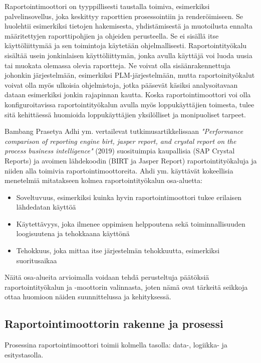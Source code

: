 Raportointimoottori on tyyppillisesti taustalla toimiva, esimerkiksi palvelinsovellus, joka keskittyy raporttien prosessointiin ja renderöimiseen. Se huolehtii esimerkiksi tietojen hakemisesta, yhdistämisestä ja muotoilusta ennalta määritettyjen raporttipohjien ja ohjeiden perusteella. Se ei sisällä itse käyttöliittymää ja sen toimintoja käytetään ohjelmallisesti. Raportointityökalu sisältää usein jonkinlaisen käyttöliittymän, jonka avulla käyttäjä voi luoda uusia tai muokata olemassa olevia raportteja. Ne voivat olla sisäänrakennettuja johonkin järjestelmään, esimerkiksi PLM-järjestelmään, mutta raportoinityökalut voivat olla myös ulkoisia ohjelmistoja, jotka pääsevät käsiksi analysoitavaan dataan esimerkiksi jonkin rajapinnan kautta. Koska raportointimoottori voi olla konfiguroitavissa raportointityökalun avulla myös loppukäyttäjien toimesta, tulee sitä kehittäessä huomioida loppukäyttäjien yksilölliset ja monipuoliset tarpeet. \cite{adhi_performance_2019}

Bambang Prasetya Adhi ym. vertailevat tutkimusartikkelissaan \textit{"Performance comparison of reporting engine birt, jasper report, and crystal report on the process business intelligence"} (2019)  \cite{adhi_performance_2019} suosituimpia kaupallisia (SAP Crystal Reports) ja avoimen lähdekoodin (BIRT ja Jasper Report) raportointityökaluja ja niiden alla toimivia raportointimoottoreita. Ahdi ym. käyttävät kokeellisia menetelmiä mitatakseen kolmea raportointityökalun osa-aluetta:
\begin{itemize}
\item Soveltuvuus, esimerkiksi kuinka hyvin raportointimoottori tukee erilaisen lähdedatan käyttöä
\item Käytettävyys, joka ilmenee oppimisen helppoutena sekä toiminnallisuuden loogisuutena ja tehokkaana käyttönä
\item Tehokkuus, joka mittaa itse järjestelmän tehokkuutta, esimerkiksi suoritusaikaa
\end{itemize}
Näitä osa-alueita arvioimalla voidaan tehdä perusteltuja päätöksiä raportointityökalun ja -moottorin valinnasta, joten nämä ovat tärkeitä seikkoja ottaa huomioon näiden suunnittelussa ja kehityksessä.

\subsection{Raportointimoottorin rakenne ja prosessi} \label{Raportointimoottorin rakenne ja prosessi}

Prosessina raportointimoottori toimii kolmella tasolla: data-, logiikka- ja esitystasolla. \cite{he_design_2010}

